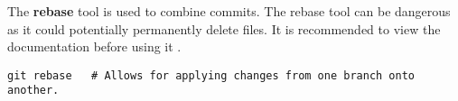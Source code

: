 The \textbf{rebase} tool is used to combine commits. The rebase tool can be dangerous as it could potentially permanently delete files. It is recommended to view the documentation before using it \cite{git}\cite{git: Advanced}.
\begin{lstlisting}
git rebase   # Allows for applying changes from one branch onto another.
\end{lstlisting}
